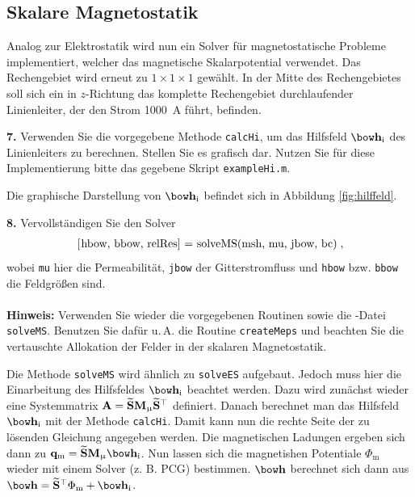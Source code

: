 \documentclass[Protokollheft.tex]{subfiles}
\begin{document}
%
{\subsection{Skalare Magnetostatik}}
Analog zur Elektrostatik wird nun ein Solver für magnetostatische Probleme implementiert, welcher das magnetische Skalarpotential verwendet. Das Rechengebiet wird erneut zu $1\times 1\times 1$ gewählt. In der Mitte des Rechengebietes soll sich ein in $z$-Richtung das komplette Rechengebiet durchlaufender Linienleiter, der den Strom \SI{1000}{A} führt, befinden.

\begin{framed}
	\noindent \textbf{7.} Verwenden Sie die vorgegebene Methode \lstinline{calcHi}, um das Hilfsfeld $\hfit_{\text{i}}$ des Linienleiters zu berechnen.
Stellen Sie es grafisch dar. Nutzen Sie für diese Implementierung bitte das gegebene Skript \lstinline{exampleHi.m}.\label{exer:visualizeHi}
\end{framed}
\noindent
Die graphische Darstellung von $\hfit_{\text{i}}$ befindet sich in Abbildung \ref{fig:hilffeld}.

\begin{framed}
	\noindent \textbf{8.} Vervollständigen Sie den Solver
\begin{align}
\lstinline{[hbow, bbow, relRes] = solveMS(msh, mu, jbow, bc)} \; ,
\end{align}
wobei \lstinline{mu} hier die Permeabilität, \lstinline{jbow} der Gitterstromfluss und
\lstinline{hbow} bzw. \lstinline{bbow} die Feldgrößen sind.\\
\ \\
{\textbf{Hinweis:}} Verwenden Sie wieder die vorgegebenen Routinen sowie die \matlab-Datei \lstinline{solveMS}. Benutzen Sie
dafür u.\,A. die Routine \lstinline{createMeps} und beachten Sie die vertauschte Allokation der Felder in der skalaren Magnetostatik.\label{exer:solveMS}
\end{framed}
\noindent
Die Methode \lstinline{solveMS} wird  ähnlich zu  \lstinline{solveES} aufgebaut. Jedoch muss hier die Einarbeitung  des Hilfsfeldes $\hfit_{\text{i}}$ beachtet werden. Dazu wird zunächst wieder eine Systemmatrix $\mathbf{A}=\widetilde{\mathbf{S}}\mathbf{M}_{\upmu}\widetilde{\mathbf{S}}^\top$ definiert. Danach berechnet man das Hilfsfeld $\hfit_{\text{i}}$ mit der Methode  \lstinline{calcHi}. Damit kann nun die rechte Seite der zu lösenden Gleichung angegeben werden. Die magnetischen Ladungen ergeben sich dann zu $\mathbf{q}_{\text{m}}=\divdfit\Mmu\hfit_{\text{i}}$. Nun lassen sich die magnetishen Potentiale $\Phi_\text{m}$ wieder mit einem Solver (z. B. PCG) bestimmen. $\hfit$ berechnet sich dann aus $\hfit=\divdfit^\top\Phi_\text{m}+\hfit_{\text{i}}$.
\end{document}
